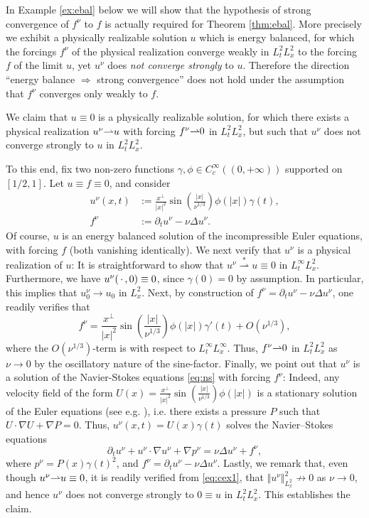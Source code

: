 \documentclass[reqno,12pt]{amsart}
\newcommand{\wstarto}{\overset{\ast}{\rightharpoonup}}
\begin{document}
   In Example \ref{ex:ebal} below we will show that the hypothesis of strong convergence of $f^\nu$ to $f$ is actually required for Theorem \ref{thm:ebal}.
   More precisely we exhibit a physically realizable solution $u$ which is energy balanced, for which the forcings $f^\nu$ of the physical realization converge weakly in $L^2_t L^2_x$ to the forcing $f$ of the limit $u$, yet $u^\nu$ does \emph{not converge strongly} to $u$. Therefore the direction ``energy balance $\Rightarrow$ strong convergence'' does not hold under the assumption that $f^\nu$ converges only weakly to $f$.


\begin{example}
  \label{ex:ebal}
  We claim that $u\equiv 0$ is a physically realizable solution, for which there exists a physical realization $u^\nu {\rightharpoonup} u$ with forcing $f^\nu {\rightharpoonup} 0$ in $L^2_tL^2_x$, but such that $u^\nu $ does not converge strongly to $u$ in $L^2_t L^2_x$.

  To this end, fix two non-zero functions $\gamma, \phi \in C^\infty_c((0,+\infty))$ supported on $[1/2,1]$. Let $u \equiv f \equiv 0$, and consider
\begin{align}
    u^\nu(x,t) &:= \frac{x^\perp}{|x|^2} \sin\left(\frac{|x|}{\nu^{1/3}}\right)\phi(|x|)\gamma(t), \label{eq:cex1}\\
    f^\nu &:= \partial_t u^\nu - \nu \Delta u^\nu. \label{eq:cex2}
\end{align}
Of course, $u$ is an energy balanced solution of the incompressible Euler equations, with forcing $f$ (both vanishing identically). We next verify that $u^\nu$ is a physical realization of $u$: It is straightforward to show that $u^\nu \wstarto u \equiv 0$ in $L^\infty_t L^2_x$. Furthermore, we have
$u^\nu({\,\cdot\,},0) \equiv 0$, since $\gamma(0) = 0$ by assumption. In particular, this implies that $u^\nu_0 \to u_0$ in $L^2_x$. Next, by construction of $f^\nu = \partial_t u^\nu - \nu \Delta u^\nu$, one readily verifies that
\[
f^\nu = \frac{x^\perp}{|x|^2} \sin\left( \frac{|x|}{\nu^{1/3}} \right) \phi(|x|) \gamma'(t)
+ O(\nu^{1/3}),
\]
where the $O(\nu^{1/3})$-term is with respect to $L^\infty_tL^\infty_x$. Thus, $f^\nu {\rightharpoonup} 0$ in $L^2_tL^2_x$ as $\nu \to 0$ by the oscillatory nature of the sine-factor. Finally, we point out that $u^\nu$ is a solution of the Navier-Stokes equations \eqref{eq:ns} with forcing $f^\nu$: Indeed, any velocity field of the form $U(x) = \frac{x^\perp}{|x|^2} \sin\left(\frac{|x|}{\nu^{1/3}}\right)\phi(|x|)$ is a stationary solution of the Euler equations (see e.g. \cite[Chapter 2.2.1, Example 2.1]{MajdaBertozzi}), i.e. there exists a pressure $P$ such that $U \cdot \nabla U + \nabla P = 0$. Thus, $u^\nu(x,t) = U(x) \gamma(t)$ solves the Navier--Stokes equations
\[
    \partial_t u^\nu + u^\nu \cdot \nabla u^\nu + \nabla p^\nu = \nu \Delta u^\nu + f^\nu,
\]
where $p^\nu = P(x)\gamma(t)^2$, and $f^\nu = \partial_t u^\nu - \nu \Delta u^\nu$. Lastly, we remark that, even though $u^\nu {\rightharpoonup} u\equiv 0$, it is readily verified from \eqref{eq:cex1}, that $\Vert u^\nu \Vert_{L^2_x}^2 \not \to 0$ as $\nu \to 0$, and hence $u^\nu $ does not converge strongly to $0 \equiv u$ in $L^2_tL^2_x$. This establishes the claim.


\end{example}
\end{document}
